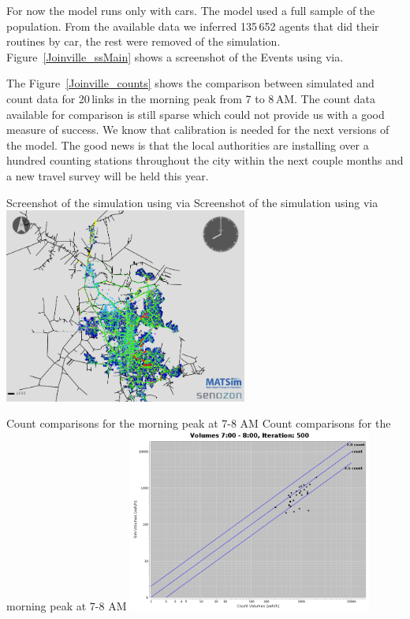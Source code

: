 For now the model runs only with cars. The model used a full sample of the population. From the available data we inferred 135\,652 agents that did their routines by car, the rest were removed of the simulation. Figure~\ref{Joinville_ssMain} shows a screenshot of the Events using \gls{via}.

The Figure~\ref{Joinville_counts} shows the comparison between simulated and count data for 20\,links in the morning peak from 7 to 8\,AM. The count data available for comparison is still sparse which could not provide us with a good measure of success. We know that calibration is needed for the next versions of the model. The good news is that the local authorities are installing over a hundred counting stations throughout the city within the next couple months and a new travel survey will be held this year. 

\createfigure%
{Screenshot of the simulation using \gls{via}}%
{Screenshot of the simulation using \gls{via}}%
{\label{fig:Joinville_ssMain}}%
{\includegraphics[width=0.6\textwidth, angle=0]{./scenarios/figures/Joinville_ssMain.png}}%
{}

\createfigure%
{Count comparisons for the morning peak at 7-8 AM}%
{Count comparisons for the morning peak at 7-8 AM}%
{\label{fig:Joinville_counts}}%
{\includegraphics[width=0.6\textwidth, angle=0]{./scenarios/figures/Joinville_LogManha.png}}%
{}

